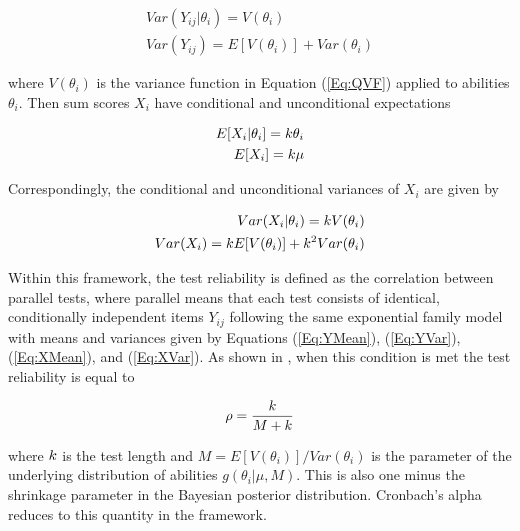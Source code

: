 \documentclass[12pt,epsfig]{article}
\newcommand{\changed}[1]{\textcolor{black}{#1}}
\newcommand{\testlength}{\changed{k}}%
\begin{document}
\begin{equation}
\begin{aligned}
Var(Y_{ij} | \theta_i) = V(\theta_i)\\
Var(Y_{ij}) = E[V(\theta_i)] + Var(\theta_i)
\label{Eq:YVar}
\end{aligned}
\end{equation}

\noindent where $V(\theta_i)$ is the variance function in Equation (\ref{Eq:QVF}) applied to abilities $\theta_i$. Then sum scores $X_i$ have conditional and unconditional expectations

\begin{equation}
\begin{aligned}
E[X_i| \theta_i] = \testlength \theta_i  \\
E[X_i] = \testlength \mu  
\label{Eq:XMean}
\end{aligned}
\end{equation}

\noindent Correspondingly, the conditional and unconditional variances of $X_i$ are given by 

\begin{equation}
\begin{aligned}
Var(X_i | \theta_i) = \testlength V(\theta_i)\\
Var(X_i) = \testlength E[V(\theta_i)] + \testlength^2 Var(\theta_i)
\label{Eq:XVar}
\end{aligned}
\end{equation}


 Within this framework, the test reliability is defined as the correlation between parallel tests, where parallel means that each test consists of identical, conditionally independent items $Y_{ij}$ following the same exponential family model with means and variances given by Equations (\ref{Eq:YMean}), (\ref{Eq:YVar}), (\ref{Eq:XMean}), and (\ref{Eq:XVar}). As shown in \cite{Foster2020}, when this condition is met the test reliability is equal to

\begin{equation*}
\rho = \dfrac{\testlength}{M + \testlength}
\end{equation*}

\noindent where $\testlength$ is the test length and $M = E[V(\theta_i)]/Var(\theta_i)$ is the parameter of the underlying distribution of abilities $g(\theta_i | \mu, M)$. This is also one minus the shrinkage parameter in the Bayesian posterior distribution.  Cronbach's alpha reduces to this quantity in the framework.
\end{document}
